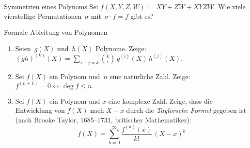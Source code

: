 \documentclass{algblatt}
\begin{document}
\begin{aufgabe}{Symmetrien eines Polynoms}
Sei $f(X, Y, Z, W) := X Y + Z W + X Y Z W$.
Wie viele vierstellige Permutationen~$\sigma$ mit~$\sigma \cdot f = f$ gibt es?
\end{aufgabe}

\begin{aufgabe}{Formale Ableitung von Polynomen}
\begin{enumerate}
\item Seien~$g(X)$ und~$h(X)$ Polynome. Zeige:
$
  (g h)^{(k)}(X)
  = \sum_{i + j = k} \binom k i \, g^{(i)}(X) \, h^{(j)}(X).
$

\item Sei $f(X)$ ein Polynom und~$n$ eine natürliche Zahl. Zeige:
$f^{(n + 1)} = 0 \Longleftrightarrow \deg f \leq n.$

\item Sei $f(X)$ ein Polynom und $x$ eine komplexe Zahl. Zeige, dass die
Entwicklung von $f(X)$ nach $X - x$ durch die \emph{Taylorsche Formel} gegeben
ist (nach Brooke Taylor, 1685--1731, britischer Mathematiker):
\[
    f(X) = \sum_{k = 0}^\infty \frac{f^{(k)}(x)}{k!} \, (X - x)^k
\]
\end{enumerate}
\end{aufgabe}
\end{document}
